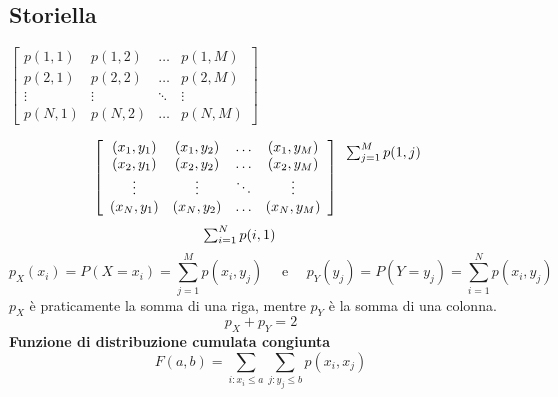 \documentclass[12pt]{article}
\begin{document}
\subsection*{Storiella}
\begin{center}
    \(
        \begin{bmatrix}
            p(1,1) & p(1,2) & \ldots & p(1,M) \\ 
            p(2,1) & p(2,2) & \ldots & p(2,M) \\
            \vdots & \vdots & \ddots & \vdots \\
            p(N,1) & p(N,2) & \ldots & p(N,M)
        \end{bmatrix}    
    \)
\end{center}
$$
\left[\begin{array}{cccc}  
    (x_{1},y_{1}) & (x_{1},y_{2}) & \ldots & (x_{1},y_{M}) \\
    (x_{2},y_{1}) & (x_{2},y_{2}) & \ldots & (x_{2},y_{M}) \\
    \vdots & \vdots & \ddots & \vdots \\
    (x_{N},y_{1}) & (x_{N},y_{2}) & \ldots & (x_{N},y_{M})
\end{array}\right] \begin{array}{c}
	\sum_{j=1}^{M} p(1,j) \\
	\vphantom{} \\
    \vphantom{} \\
    \vphantom{}
\end{array}
$$
$$
\begin{array}{cccc}
    \sum_{i=1}^{N} p(i,1) & \hphantom{} & \hphantom{} & \hphantom{} 
\end{array}
$$
\begin{equation*}
    p_{X}(x_{i}) = P(X=x_{i}) = \sum_{j=1}^{M} p(x_{i},y_{j}) \quad \text{ e } \quad p_{Y}(y_{j}) = P(Y=y_{j}) = \sum_{i=1}^{N} p(x_{i},y_{j})
\end{equation*}
$p_{X}$ è praticamente la somma di una riga, mentre $p_{Y}$ è la somma di una colonna.
\begin{equation*}
    p_{X}+p_{Y} = 2
\end{equation*}
\textbf{Funzione di distribuzione cumulata congiunta}
\begin{equation*}
    F(a,b)=\sum_{i:x_{i}\leq a}\sum_{j:y_{j}\leq b} p(x_{i},x_{j})
\end{equation*}
\end{document}
